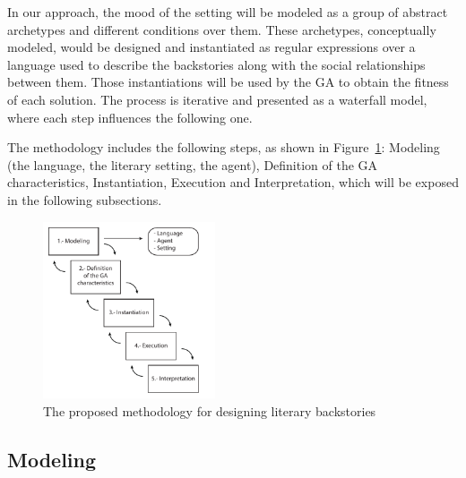 \documentclass[letterpaper]{article}
\begin{document}
In our approach, the mood of the setting will be modeled as a group of abstract archetypes and different conditions over them. These archetypes, conceptually modeled, would be designed and instantiated as regular expressions over a language used to describe the backstories along with the social relationships between them. Those instantiations will be used by the GA to obtain the fitness of each solution. The process is iterative and presented as a waterfall model, where each step influences the following one.

The methodology includes the following steps, as shown in Figure~\ref{fig:methodology}: Modeling (the language, the literary setting, the agent), Definition of the GA characteristics, Instantiation, Execution and Interpretation, which will be exposed in the following subsections.


\begin{figure}[htb]
\centering
   \includegraphics[width=12pc] {img/methodology.pdf}
\caption{The proposed methodology for designing literary backstories}
\label{fig:methodology}
\end{figure}


\subsection{Modeling}
\end{document}
